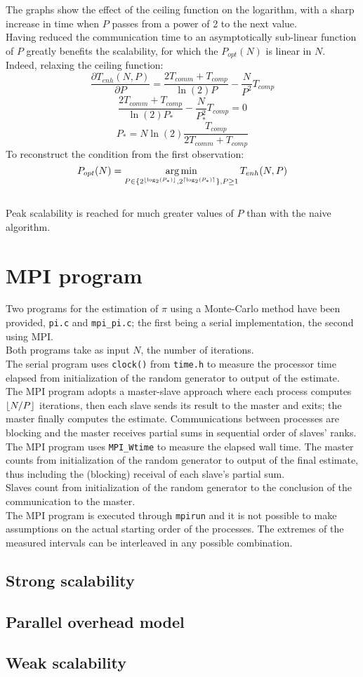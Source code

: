 \documentclass[a4paper, 11pt]{article}
\DeclareMathOperator*{\argmin}{arg\,min}
\DeclarePairedDelimiter{\ceil}{\lceil}{\rceil}
\DeclarePairedDelimiter{\floor}{\lfloor}{\rfloor}
\begin{document}
The graphs show the effect of the ceiling function on the logarithm, with a sharp increase in time when $P$ passes from a power of 2 to the next value.\\
Having reduced the communication time to an asymptotically sub-linear function of $P$ greatly benefits the scalability, for which the $P_{opt}(N)$ is linear in $N$.\\
Indeed, relaxing the ceiling function:
$$\frac{\partial T_{enh}(N, P)}{\partial P} = \frac{2T_{comm} + T_{comp}}{\ln(2)P} -\frac{N}{P^{2}} T_{comp}$$
$$\frac{2T_{comm} + T_{comp}}{\ln(2)P_{*}} - \frac{N}{P_{*}^{2}} T_{comp} = 0$$
$$P_{*} = N\ln(2)\frac{T_{comp}}{2T_{comm} + T_{comp}}$$
To reconstruct the condition from the first observation:
$$P_{opt}(N) = \argmin_{P \in \{ 2^{\floor{\log_2(P_{*})}}, 2^{\ceil{\log_2(P_{*})}} \}, P \geq 1}{T_{enh}(N, P)} $$\\
Peak scalability is reached for much greater values of $P$ than with the naive algorithm.\\
\section{MPI program}
Two programs for the estimation of $\pi$ using a Monte-Carlo method have been provided, \texttt{pi.c} and \texttt{mpi\_pi.c}; the first being a serial implementation, the second using MPI.\\
Both programs take as input $N$, the number of iterations.\\
The serial program uses \texttt{clock()} from \texttt{time.h} to measure the processor time elapsed from initialization of the random generator to output of the estimate.\\
The MPI program adopts a master-slave approach where each process computes $\floor{N/P}$ iterations, then each slave sends its result to the master and exits; the master finally computes the estimate. Communications between processes are blocking and the master receives partial sums in sequential order of slaves' ranks.\\
The MPI program uses \texttt{MPI\_Wtime} to measure the elapsed wall time. The master counts from initialization of the random generator to output of the final estimate, thus including the (blocking) receival of each slave's partial sum.\\
Slaves count from initialization of the random generator to the conclusion of the communication to the master.\\
The MPI program is executed through \texttt{mpirun} and it is not possible to make assumptions on the actual starting order of the processes. The extremes of the measured intervals can be interleaved in any possible combination.
\subsection{Strong scalability}

\subsection{Parallel overhead model}

\subsection{Weak scalability}
\end{document}
